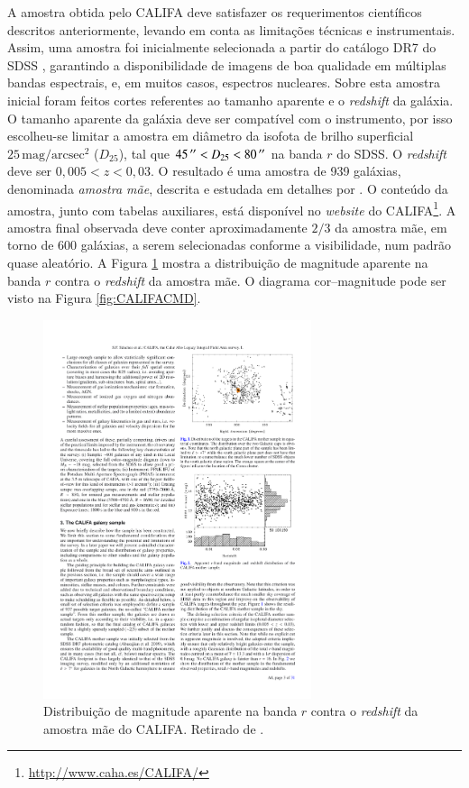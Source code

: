 A amostra obtida pelo CALIFA deve satisfazer os requerimentos científicos
descritos anteriormente, levando em conta as limitações técnicas e
instrumentais. Assim, uma amostra foi inicialmente selecionada a partir do
catálogo DR7 do SDSS \citep{Abazajian2009}, garantindo a disponibilidade de
imagens de boa qualidade em múltiplas bandas espectrais, e, em muitos casos,
espectros nucleares. Sobre esta amostra inicial foram feitos cortes referentes
ao tamanho aparente e o {\em redshift} da galáxia. O tamanho aparente da galáxia
deve ser compatível com o instrumento, por isso escolheu-se limitar a amostra em
diâmetro da isofota de brilho superficial $25\,\mathrm{mag}/\mathrm{arcsec}^2$
($D_{25}$), tal que $45\,^{\prime\prime} < D_{25} < 80\,^{\prime\prime}$ na banda $r$ do SDSS. O
{\em redshift} deve ser $0,005 < z < 0,03$.
O resultado é uma amostra de 939 galáxias, denominada {\em amostra mãe},
descrita e estudada em detalhes por \citet{Walcher2014}. O conteúdo da amostra,
junto com tabelas auxiliares, está disponível no {\em website} do
CALIFA\footnote{\url{http://www.caha.es/CALIFA/}}. A amostra final observada
deve conter aproximadamente $2/3$ da amostra mãe, em torno de 600 galáxias, a
serem selecionadas conforme a visibilidade, num padrão quase aleatório. A Figura
\ref{fig:CALIFASample} mostra a distribuição de magnitude aparente na banda $r$
contra o {\em redshift} da amostra mãe. O diagrama cor--magnitude pode ser visto
na Figura \ref{fig:CALIFACMD}.


\begin{figure}
	\includegraphics[width=0.7\textwidth]{figuras/CALIFASample}
	\caption[Distribuição de magnitude $r$ contra {\em redshift} da amostra mãe
	do CALIFA] {Distribuição de magnitude aparente na banda $r$ contra o {\em
	redshift} da amostra mãe do CALIFA. Retirado de \citet{Sanchez2012}.}
	\label{fig:CALIFASample}
\end{figure}

